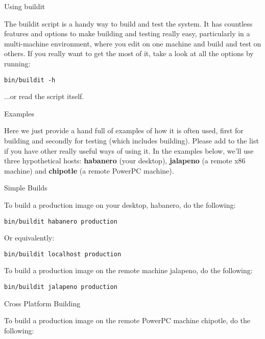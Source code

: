 \begin{section}{Using buildit}
\label{sec:usingbuildit}

The buildit script is a handy way to build and test the system.  It has countless features and options to make building and testing really easy, particularly in a multi-machine environment, where you edit on one machine and build and test on others.  If you really want to get the most of it, take a look at all the options by running:

\begin{lstlisting}
bin/buildit -h
\end{lstlisting}

...or read the script itself.

\begin{subsection}{Examples}

Here we just provide a hand full of examples of how it is often used, first for building and secondly for testing (which includes building). Please add to the list if you have other really useful ways of using it.  In the examples below, we'll use three hypothetical hosts: \textbf{habanero} (your desktop), \textbf{jalapeno} (a remote x86 machine) and \textbf{chipotle} (a remote PowerPC machine).

\begin{subsubsection}{Simple Builds}

To build a production image on your desktop, habanero, do the following: 

\begin{lstlisting}
bin/buildit habanero production
\end{lstlisting}

Or equivalently:

\begin{lstlisting}
bin/buildit localhost production
\end{lstlisting}

To build a production image on the remote machine jalapeno, do the following: 

\begin{lstlisting}
bin/buildit jalapeno production
\end{lstlisting}

\end{subsubsection}

\begin{subsubsection}{Cross Platform Building}

To build a production image on the remote PowerPC machine chipotle, do the following: 


\end{subsubsection}
\end{subsection}
\end{section}

